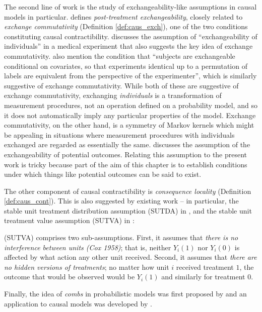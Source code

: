 The second line of work is the study of exchangeability-like assumptions in causal models in particular. \citet{dawid_decision-theoretic_2020} defines \emph{post-treatment exchangeability}, closely related to \emph{exchange commutativity} (Definition \ref{def:caus_exch}), one of the two conditions constituting causal contractibility. \citet{greenland_identifiability_1986} discusses the assumption of ``exchangeability of individuals'' in a medical experiment that also suggests the key idea of exchange commutativity. \citet{banerjee_chapter_2017} also mention the condition that ``subjects are exchangeable conditional on covariates, so that experiments identical up to a permutation of labels are equivalent from the perspective of the experimenter'', which is similarly suggestive of exchange commutativity. While both of these are suggestive of exchange commutativity, exchanging \emph{individuals} is a transformation of measurement procedures, not an operation defined on a probability model, and so it does not automatically imply any particular properties of the model. Exchange commutativity, on the other hand, is a symmetry of Markov kernels which might be appealing in situations where measurement procedures with individuals exchanged are regarded as essentially the same. \citet{rubin_causal_2005} discusses the assumption of the exchangeability of potential outcomes. Relating this assumption to the present work is tricky because part of the aim of this chapter is to establish conditions under which things like potential outcomes can be said to exist.

The other component of causal contractibility is \emph{consequence locality} (Definition \ref{def:caus_cont}). This is also suggested by existing work -- in particular, the stable unit treatment distribution assumption (SUTDA) in \citet{dawid_decision-theoretic_2020}, and the stable unit treatment value assumption (SUTVA) in \citep{rubin_causal_2005}:
\begin{blockquote}
(SUTVA) comprises two sub-assumptions. First, it assumes that \emph{there is no interference between units (Cox 1958)}; that is, neither $Y_i(1)$ nor $Y_i(0)$ is affected by what action any other unit received. Second, it assumes that \emph{there are no hidden versions of treatments}; no matter how unit $i$ received treatment $1$, the outcome that would be observed would be $Y_i(1)$ and similarly for treatment $0$.
\end{blockquote}

Finally, the idea of \emph{combs} in probabilistic models was first proposed by \citet{chiribella_quantum_2008} and an application to causal models was developed by \citet{jacobs_causal_2019}.


